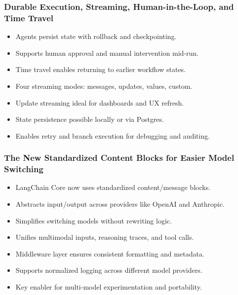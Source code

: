 \begin{frame}[fragile]\frametitle{Durable Execution, Streaming, Human-in-the-Loop, and Time Travel}
  \begin{itemize}
    \item Agents persist state with rollback and checkpointing.
    \item Supports human approval and manual intervention mid-run.
    \item Time travel enables returning to earlier workflow states.
    \item Four streaming modes: messages, updates, values, custom.
    \item Update streaming ideal for dashboards and UX refresh.
    \item State persistence possible locally or via Postgres.
    \item Enables retry and branch execution for debugging and auditing.
  \end{itemize}
\end{frame}

\begin{frame}[fragile]\frametitle{The New Standardized Content Blocks for Easier Model Switching}
  \begin{itemize}
    \item LangChain Core now uses standardized content/message blocks.
    \item Abstracts input/output across providers like OpenAI and Anthropic.
    \item Simplifies switching models without rewriting logic.
    \item Unifies multimodal inputs, reasoning traces, and tool calls.
    \item Middleware layer ensures consistent formatting and metadata.
    \item Supports normalized logging across different model providers.
    \item Key enabler for multi-model experimentation and portability.
  \end{itemize}
\end{frame}

